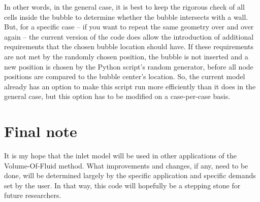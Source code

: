 \documentclass[fleqn,10pt,a4paper,twoside,english]{book}
\begin{document}
In other words, in the general case, it is best to keep the rigorous check of all cells inside the bubble to determine whether the bubble intersects with a wall. But, for a specific case – if you want to repeat the same geometry over and over again –  the current version of the code does allow the introduction of additional requirements that the chosen bubble location should have. If these requirements are not met by the randomly chosen position, the bubble is not inserted and a new position is chosen by the Python script’s random generator, before all node positions are compared to the bubble center's location. So, the current model already has an option to make this script run more efficiently than it does in the general case, but this option has to be modified on a case-per-case basis.
\section{Final note}
It is my hope that the inlet model will be used in other applications of the Volume-Of-Fluid method. What improvements and changes, if any, need to be done, will be determined largely by the specific application and specific demands set by the user. In that way, this code will hopefully be a stepping stone for future researchers.
\end{document}
